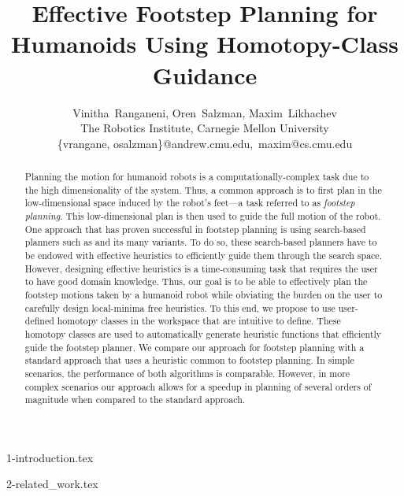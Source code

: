 \documentclass[letterpaper]{article} %
\begin{document}
%
\title{Effective Footstep Planning for Humanoids Using Homotopy-Class Guidance}
\author{Vinitha~Ranganeni, Oren~Salzman, Maxim~Likhachev\\
The Robotics Institute, Carnegie Mellon University\\
\{vrangane, osalzman\}@andrew.cmu.edu,~maxim@cs.cmu.edu\\
}
\maketitle

\begin{abstract}
Planning the motion for humanoid robots is a computationally-complex task due to the high dimensionality of the system. Thus, a common approach is to first plan in the low-dimensional space induced by the robot's feet---a task referred to as \emph{footstep planning}. This low-dimensional plan is then used to guide the full motion of the robot. One approach that has proven successful in footstep planning is using search-based planners such as \astar and its many variants. To do so, these search-based planners have to be endowed with effective heuristics to efficiently guide them through the search space. However, designing effective heuristics is a time-consuming task that requires the user to have good domain knowledge. Thus, our goal is to be able to effectively plan the footstep motions taken by a humanoid robot while obviating the burden on the user to carefully design local-minima free heuristics. To this end, we propose to use user-defined homotopy classes in the workspace that are intuitive to define. These homotopy classes are used to automatically generate heuristic functions that efficiently guide the footstep planner. 
We compare our approach for footstep planning with a standard approach that uses a heuristic common to footstep planning.
In simple scenarios, the performance of both algorithms is comparable.
However, in more complex scenarios our approach allows for a speedup in planning of several orders of magnitude when compared to the standard approach.
\end{abstract}


{1-introduction.tex}

{2-related_work.tex}
\end{document}
